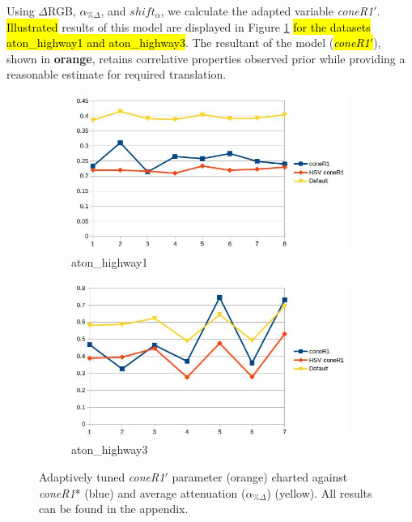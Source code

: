 \documentclass[12pt]{report}
\begin{document}
Using $\Delta$RGB, $\alpha_{\%\Delta}$, and $shift_{\alpha}$, we calculate the adapted variable \textit{coneR1}$'$. \hl{Illustrated} results of this model are displayed in Figure \ref{fig:new_coneR1} \hl{for the datasets aton\_highway1 and aton\_highway3}. The resultant of the model (\hl{\textit{coneR1}$'$}), shown in \textbf{orange}, retains correlative properties observed prior while providing a reasonable estimate for required translation.

\begin{figure}
  \centering
  \begin{subfigure}{1\linewidth}
  \includegraphics[width=1\linewidth]{figures/model/highway1_calc_coneR1.jpg}
  \caption{aton\_highway1}
\end{subfigure}
\hfill
\begin{subfigure}{1\linewidth}
  \includegraphics[width=1\linewidth]{figures/model/highway3_calc_coneR1.jpg}
  \caption{aton\_highway3}
\end{subfigure}

\caption{Adaptively tuned \textit{coneR1}$'$ parameter (orange) charted against \textit{coneR1}* (blue) and average attenuation ($\alpha_{\%\Delta}$) (yellow). All results can be found in the appendix.}
\label{fig:new_coneR1}
\end{figure}
\end{document}

